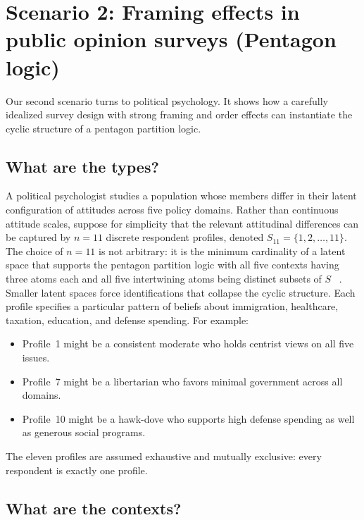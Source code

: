 \documentclass{article}
\begin{document}
\section{Scenario 2: Framing effects in public opinion surveys
(Pentagon logic)}
\label{sec:surveys}

Our second scenario turns to political psychology. It shows how a
carefully idealized survey design with strong framing and order
effects can instantiate the cyclic structure of a pentagon partition
logic.

\subsection{What are the types?}

A political psychologist studies a population whose members differ
in their latent configuration of attitudes across five policy
domains. Rather than continuous attitude scales, suppose for
simplicity that the relevant attitudinal differences can be captured
by $n=11$ discrete respondent profiles, denoted
$S_{11}=\{1,2,\ldots,11\}$. The choice of $n=11$ is not arbitrary:
it is the minimum cardinality of a latent space that supports the
pentagon partition logic with all five contexts having three atoms
each and all five intertwining atoms being distinct subsets of $S$
~\cite[p.~267, Fig.~2]{wright:pent}. Smaller latent spaces force
identifications that collapse the cyclic structure. Each profile
specifies a particular pattern of beliefs about immigration,
healthcare, taxation, education, and defense spending. For example:
\begin{itemize}
\item Profile~1 might be a consistent moderate who holds centrist
views on all five issues.
\item Profile~7 might be a libertarian who favors minimal government
across all domains.
\item Profile~10 might be a hawk-dove who supports high defense
spending as well as generous social programs.
\end{itemize}
The eleven profiles are assumed exhaustive and mutually exclusive:
every respondent is exactly one profile.

\subsection{What are the contexts?}
\end{document}
